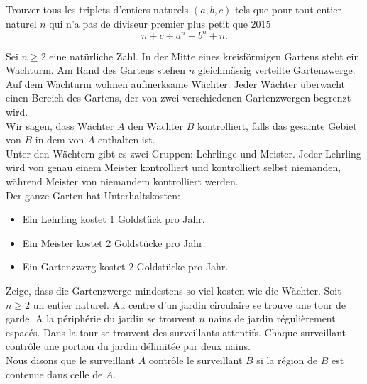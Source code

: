 \documentclass[language=german,style=exam]{smo} %
\begin{document}
\begin{enumerate}
{%

\fi
\iffrench %
Trouver tous les triplets d'entiers naturels $(a,b,c)$ tels que pour tout entier naturel $n$ qui n'a pas de diviseur premier plus petit que $2015$
\[
n+c \div a^n+b^n+n.
\]
\fi
\ifitalian %
\fi

\bigskip
\bigskip

\item[\textbf{9.}] %
\ifgerman %
Sei $n \geq 2$ eine natürliche Zahl. In der Mitte eines kreisförmigen Gartens steht ein Wachturm. Am Rand des Gartens stehen $n$ gleichmässig verteilte Gartenzwerge. Auf dem Wachturm wohnen aufmerksame Wächter. Jeder Wächter überwacht einen Bereich des Gartens, der von zwei verschiedenen Gartenzwergen begrenzt wird.\\
Wir sagen, dass Wächter $A$ den Wächter $B$ kontrolliert, falls das gesamte Gebiet von $B$ in dem von $A$ enthalten ist.\\
Unter den Wächtern gibt es zwei Gruppen: Lehrlinge und Meister. Jeder Lehrling wird von genau einem Meister kontrolliert und kontrolliert selbst niemanden, während Meister von niemandem kontrolliert werden.\\
Der ganze Garten hat Unterhaltskosten:
\begin{itemize}
\item Ein Lehrling kostet 1 Goldstück pro Jahr.
\item Ein Meister kostet 2 Goldstücke pro Jahr.
\item Ein Gartenzwerg kostet 2 Goldstücke pro Jahr.
\end{itemize}
Zeige, dass die Gartenzwerge mindestens so viel kosten wie die Wächter.
\fi
\iffrench %
Soit $n \geq 2$ un entier naturel. Au centre d'un jardin circulaire se trouve une tour de garde. A la périphérie du jardin se trouvent $n$ nains de jardin régulièrement espacés. Dans la tour se trouvent des surveillants attentifs. Chaque surveillant contrôle une portion du jardin délimitée par deux nains.\\
Nous disons que le surveillant $A$ contrôle le surveillant $B$ si la région de $B$ est contenue dans celle de $A$.\\
}
\end{enumerate}
\end{document}
